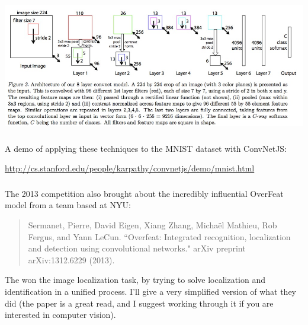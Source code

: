 \documentclass[xetex,mathserif,serif,aspectratio=169]{beamer}
\begin{document}
\begin{frame}[fragile] \frametitle{} \oldB \small

\begin{center}
\includegraphics[width=\textwidth]{img/vizModel.jpg}
\end{center}

\end{frame}

\begin{frame}[fragile] \frametitle{} \oldB \small

A demo of applying these techniques to the MNIST dataset with ConvNetJS:

\begin{center}
\url{http://cs.stanford.edu/people/karpathy/convnetjs/demo/mnist.html}
\end{center}

\end{frame}

\begin{frame}[fragile] \frametitle{} \oldB \small


The 2013 competition also brought about the incredibly influential
OverFeat model from a team based at NYU:
\begin{quote}
Sermanet, Pierre, David Eigen, Xiang Zhang, Michaël Mathieu, Rob Fergus, and Yann LeCun. ``Overfeat: Integrated recognition, localization and detection using convolutional networks." arXiv preprint arXiv:1312.6229 (2013).
\end{quote}
The won the image localization task, by trying to solve localization
and identification in a unified process. I'll give a very simplified
version of what they did (the paper is a great read, and I suggest
working through it if you are interested in computer vision).

\end{frame}
\end{document}
